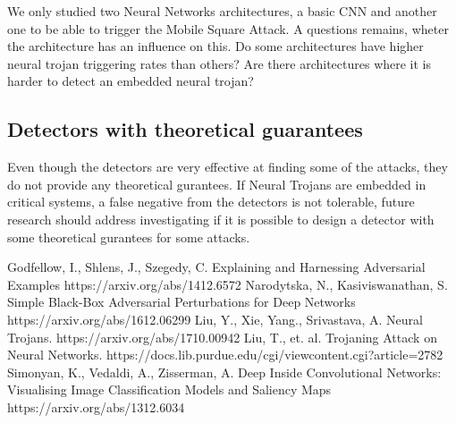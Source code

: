 \documentclass[letterpaper, 10 pt, conference]{ieeeconf}  %
\begin{document}
We only studied two Neural Networks architectures, a basic CNN and another one
to be able to trigger the Mobile Square Attack. A questions remains, wheter
the architecture has an influence on this. Do some architectures have higher
neural trojan triggering rates than others? Are there architectures where it
is harder to detect an embedded neural trojan?


\subsection{Detectors with theoretical guarantees}

Even though the detectors are very effective at finding some of the attacks,
they do not provide any theoretical gurantees. If Neural Trojans are embedded
in critical systems, a false negative from the detectors is not tolerable,
future research should address investigating if it is possible to design a
detector with some theoretical gurantees for some attacks.


\begin{thebibliography}{99}
 Godfellow, I., Shlens, J., Szegedy, C. Explaining and Harnessing Adversarial Examples https://arxiv.org/abs/1412.6572
 Narodytska, N., Kasiviswanathan, S. Simple Black-Box Adversarial Perturbations for Deep Networks https://arxiv.org/abs/1612.06299
 Liu, Y., Xie, Yang., Srivastava, A. Neural Trojans. https://arxiv.org/abs/1710.00942
 Liu, T., et. al. Trojaning Attack on Neural Networks. https://docs.lib.purdue.edu/cgi/viewcontent.cgi?article=2782 
 Simonyan, K., Vedaldi, A., Zisserman, A. Deep Inside Convolutional Networks: Visualising Image Classification Models and Saliency Maps https://arxiv.org/abs/1312.6034
\end{thebibliography}
\end{document}
